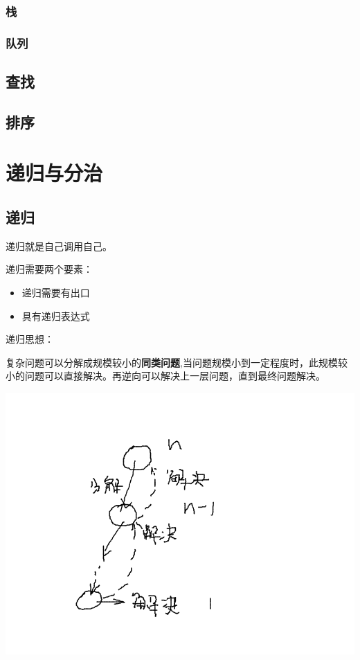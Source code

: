 \documentclass{article}
\begin{document}
\subsubsection{栈}
\subsubsection{队列}
\subsection{查找}
\subsection{排序}
\section{递归与分治}
	\subsection{递归}
		递归就是自己调用自己。

		递归需要两个要素：
		\begin{itemize}
			\item 递归需要有出口
			\item 具有递归表达式
		\end{itemize}

		递归思想：

		复杂问题可以分解成规模较小的\textbf{同类问题},当问题规模小到一定程度时，此规模较小的问题可以直接解决。再逆向可以解决上一层问题，直到最终问题解决。

		\includegraphics[scale=0.4]{pic/recurse-01.png}
\end{document}
